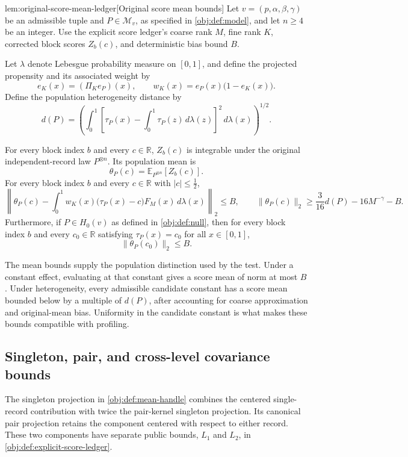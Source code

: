 \begin{lemmav}{lem:original-score-mean-ledger}[Original score mean bounds]
Let \(v=(p,\alpha,\beta,\gamma)\) be an admissible tuple and \(P\in\mathcal M_v\), as specified in \cref{obj:def:model}, and let \(n\ge4\) be an integer. Use the explicit score ledger's coarse rank \(M\), fine rank \(K\), corrected block scores \(Z_b(c)\), and deterministic bias bound \(B\).

Let \(\lambda\) denote Lebesgue probability measure on \([0,1]\), and define the projected propensity and its associated weight by
\[
e_K(x)=(\Pi_K e_P)(x),
\qquad
w_K(x)=e_P(x)\bigl(1-e_K(x)\bigr).
\]
Define the population heterogeneity distance by
\[
d(P)=
\left(
\int_0^1
\left[\tau_P(x)-\int_0^1\tau_P(z)\,d\lambda(z)\right]^2
\,d\lambda(x)
\right)^{1/2}.
\]

For every block index \(b\) and every \(c\in\mathbb R\), \(Z_b(c)\) is integrable under the original independent-record law \(P^{\otimes n}\). Its population mean is
\[
\theta_P(c)
=
\mathbb E_{P^{\otimes n}}\!\left[Z_b(c)\right].
\]
For every block index \(b\) and every \(c\in\mathbb R\) with \(|c|\le\tfrac12\),
\[
\left\|
\theta_P(c)
-
\int_0^1
w_K(x)\bigl(\tau_P(x)-c\bigr)F_M(x)\,d\lambda(x)
\right\|_2
\le B,
\qquad
\|\theta_P(c)\|_2
\ge
\frac{3}{16}d(P)-16M^{-\gamma}-B.
\]
Furthermore, if \(P\in H_0(v)\) as defined in \cref{obj:def:null}, then for every block index \(b\) and every \(c_0\in\mathbb R\) satisfying \(\tau_P(x)=c_0\) for all \(x\in[0,1]\),
\[
\|\theta_P(c_0)\|_2\le B.
\]
\end{lemmav}

The mean bounds supply the population distinction used by the test. Under a constant effect, evaluating at that constant gives a score mean of norm at most \(B\). Under heterogeneity, every admissible candidate constant has a score mean bounded below by a multiple of \(d(P)\), after accounting for coarse approximation and original-mean bias. Uniformity in the candidate constant is what makes these bounds compatible with profiling.

\subsection{Singleton, pair, and cross-level covariance bounds}

The singleton projection in \cref{obj:def:mean-handle} combines the centered single-record contribution with twice the pair-kernel singleton projection. Its canonical pair projection retains the component centered with respect to either record. These two components have separate public bounds, \(L_1\) and \(L_2\), in \cref{obj:def:explicit-score-ledger}.

